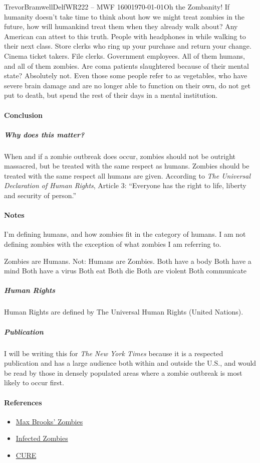 \documentclass[12pt,letterpaper]{article}
\begin{document}
\begin{mla}{Trevor}{Bramwell}{Delf}{WR222 -- MWF 1600}{\today}{Oh the Zombanity!}
If humanity doesn't take time to think about how we might treat zombies in the
future, how will humankind treat them when they already walk about? Any
American can attest to this truth. People with headphones in while walking to
their next class. Store clerks who ring up your purchase and return your
change. Cinema ticket takers. File clerks. Government employees.
All of them humans, and all of them zombies. Are coma patients slaughtered
because of their mental state? Absolutely not.
Even those some people refer to as vegetables, who have severe brain damage
and are no longer able to function on their own, do not get put to death, but
spend the rest of their days in a mental institution. 



\paragraph{Conclusion}
\subparagraph{Why does this matter?}
When and if a zombie outbreak does occur, zombies should not be outright
massacred, but be treated with the same respect as humans. Zombies should be
treated with the same respect all humans are given.
According to \emph{The Universal Declaration of Human Rights}, Article 3:
``Everyone has the right to life, liberty and security of person.''

\paragraph{Notes}
I'm defining humans, and how zombies fit in the category of humans.
I am not defining zombies with the exception of what zombies I am referring to.

Zombies are Humans. Not: Humans are Zombies.
Both have a body
Both have a mind
Both have a virus
Both eat
Both die
Both are violent
Both communicate


\subparagraph{Human Rights}
Human Rights are defined by The Universal Human Rights (United Nations).

\subparagraph{Publication}
I will be writing this for \emph{The New York Times} because it is a respected
publication and has a large audience both within and outside the U.S., and
would be read by those in densely populated areas where a zombie outbreak is
most likely to occur first.



\paragraph{References}
\begin{itemize}
\item
\href{http://zombie.wikia.com/wiki/Zombies\_(Max\_Brooks)}{Max Brooks' Zombies}
\item
\href{http://zombie.wikia.com/wiki/Infected}{Infected Zombies}
\item
\href{http://www.citizensfortheundead.com/about.html}{CURE}
\end{itemize}


\end{mla}
\end{document}
